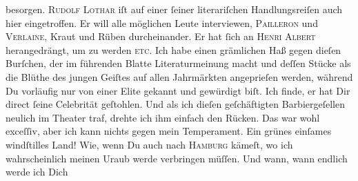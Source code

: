 \begin{ledgroupsized}[t]{13cm}
{{{                  besorgen}}}\label{K_L02619-3h}.\pend
           \pstart
           \textsc{Rudolf Lothar} iſt auf einer ſeiner literariſchen Handlungsreiſen auch hier eingetroffen. Er will alle {\pb}möglichen Leute interviewen, \textsc{Pailleron} und \textsc{Verlaine}, Kraut und Rüben durcheinander. Er hat ſich an \textsc{Henri Albert} herangedrängt, um \label{K_L02619-9v}\label{K_L02619-9h} zu
               werden \textsc{etc}. Ich habe einen grämlichen Haß gegen dieſen Burſchen, der im führenden Blatte Literaturmeinung macht
               und deſſen Stücke als die Blüthe des jungen Geiſtes \strikeout{\textcolor{gray}{×}\-\textcolor{gray}{×}} auf allen Jahrmärkten angeprieſen werden, während Du vorläufig nur von einer
               Elite gekannt und gewürdigt biſt. Ich finde, er hat Dir direct ſeine Celebrität
               geſtohlen. Und als ich dieſen geſchäftigten {\pb}Barbiergeſellen neulich im
               Theater traf, drehte ich ihm einfach den Rücken. Das war wohl exceſſiv, aber ich kann
               nichts gegen mein Temperament.\pend
           \pstart
           Ein grünes einſames windſtilles Land! Wie, wenn Du auch nach \textsc{Hamburg} kämeſt, wo ich wahrscheinlich meinen Uraub werde verbringen müſſen. Und wann,
               wann endlich werde ich Dich \label{K_L02619-6v}
\end{ledgroupsized}

